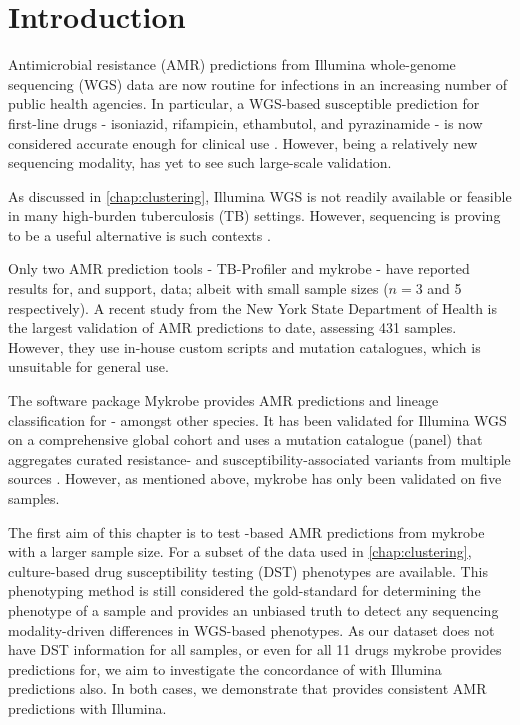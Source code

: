 \section{Introduction}
Antimicrobial resistance (AMR) predictions from Illumina whole-genome sequencing (WGS) data are now routine for \mtb{} infections in an increasing number of public health agencies. In particular, a WGS-based susceptible prediction for first-line drugs - isoniazid, rifampicin, ethambutol, and pyrazinamide - is now considered accurate enough for clinical use \cite{cryptic2018}. However, being a relatively new sequencing modality, \ont{} has yet to see such large-scale validation.

As discussed in \autoref{chap:clustering}, Illumina WGS is not readily available or feasible in many high-burden tuberculosis (TB) settings. However, \ont{} sequencing is proving to be a useful alternative is such contexts \cite{Inzaule2021,faria2016,quick2016,who-ngs2018}. 

Only two \mtb{} AMR prediction tools - TB-Profiler \cite{phelan2019} and mykrobe \cite{hunt2019} - have reported results for, and support, \ont{} data; albeit with small sample sizes ($n=3$ and 5 respectively). A recent study from the New York State Department of Health is the largest validation of \ont{} AMR predictions to date, assessing 431 samples. However, they use in-house custom scripts and mutation catalogues, which is unsuitable for general use. 

The software package Mykrobe provides AMR predictions and lineage classification for \mtb{} - amongst other species. It has been validated for Illumina WGS on a comprehensive global cohort and uses a mutation catalogue (panel) that aggregates curated resistance- and susceptibility-associated variants from multiple sources \cite{hunt2019}. However, as mentioned above, mykrobe has only been validated on five \ont{} samples.

The first aim of this chapter is to test \ont{}-based AMR predictions from mykrobe with a larger sample size. For a subset of the data used in \autoref{chap:clustering}, culture-based drug susceptibility testing (DST) phenotypes are available. This phenotyping method is still considered the gold-standard for determining the phenotype of a sample and provides an unbiased truth to detect any sequencing modality-driven differences in WGS-based phenotypes. As our dataset does not have DST information for all samples, or even for all 11 drugs mykrobe provides predictions for, we aim to investigate the concordance of \ont{} with Illumina predictions also. In both cases, we demonstrate that \ont{} provides consistent AMR predictions with Illumina.

